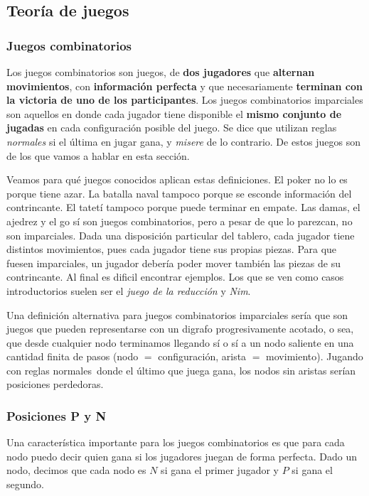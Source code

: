 
\subsection{Teoría de juegos}

\subsubsection*{Juegos combinatorios}

Los juegos combinatorios son juegos, de \textbf{dos jugadores} que
\textbf{alternan movimientos}, con \textbf{información perfecta} y que
necesariamente \textbf{terminan con la victoria de uno de los participantes}.
Los juegos combinatorios imparciales son aquellos en donde cada jugador tiene
disponible el \textbf{mismo conjunto de jugadas} en cada configuración posible
del juego. Se dice que utilizan reglas \textit{normales} si el última en jugar
gana, y \textit{misere} de lo contrario. De estos juegos son de los que vamos a
hablar en esta sección.

Veamos para qué juegos conocidos aplican estas definiciones. El poker no lo es
porque tiene azar. La batalla naval tampoco porque se esconde información del
contrincante. El tatetí tampoco porque puede terminar en empate. Las damas, el
ajedrez y el go sí son juegos combinatorios, pero a pesar de que lo parezcan, no
son imparciales. Dada una disposición particular del tablero, cada jugador tiene
distintos movimientos, pues cada jugador tiene sus propias piezas. Para que
fuesen imparciales, un jugador debería poder mover también las piezas de su
contrincante. Al final es dificil encontrar ejemplos. Los que se ven como casos
introductorios suelen ser el \textit{juego de la reducción} y \textit{Nim}.

Una definición alternativa para juegos combinatorios imparciales sería que son
juegos que pueden representarse con un digrafo progresivamente acotado, o sea,
que desde cualquier nodo terminamos llegando sí o sí a un nodo saliente en una
cantidad finita de pasos (nodo $=$ configuración, arista $=$ movimiento).
Jugando con reglas normales donde el último que juega gana, los nodos
sin aristas serían posiciones perdedoras.

\subsubsection*{Posiciones P y N}

Una característica importante para los juegos combinatorios es que para cada
nodo puedo decir quien gana si los jugadores juegan de forma perfecta. Dado un
nodo, decimos que cada nodo es $N$ si gana el primer jugador y $P$ si gana el
segundo.

